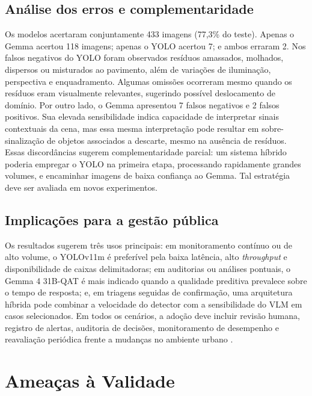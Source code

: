 \documentclass[kdmile,a4paper]{kdmile}
\begin{document}
\subsection{Análise dos erros e complementaridade}
\label{sec:analise-erros}

Os modelos acertaram conjuntamente 433 imagens (77,3\% do teste). Apenas o Gemma acertou 118 imagens; apenas o YOLO acertou 7; e ambos erraram 2. Nos falsos negativos do YOLO foram observados resíduos amassados, molhados, dispersos ou misturados ao pavimento, além de variações de iluminação, perspectiva e enquadramento. Algumas omissões ocorreram mesmo quando os resíduos eram visualmente relevantes, sugerindo possível deslocamento de domínio. Por outro lado, o Gemma apresentou 7 falsos negativos e 2 falsos positivos. Sua elevada sensibilidade indica capacidade de interpretar sinais contextuais da cena, mas essa mesma interpretação pode resultar em sobre-sinalização de objetos associados a descarte, mesmo na ausência de resíduos. Essas discordâncias sugerem complementaridade parcial: um sistema híbrido poderia empregar o YOLO na primeira etapa, processando rapidamente grandes volumes, e encaminhar imagens de baixa confiança ao Gemma. Tal estratégia deve ser avaliada em novos experimentos.

\subsection{Implicações para a gestão pública}
\label{sec:implicacoes-gestao}

Os resultados sugerem três usos principais: em monitoramento contínuo ou de alto volume, o YOLOv11m é preferível pela baixa latência, alto \emph{throughput} e disponibilidade de caixas delimitadoras; em auditorias ou análises pontuais, o Gemma 4 31B-QAT é mais indicado quando a qualidade preditiva prevalece sobre o tempo de resposta; e, em triagens seguidas de confirmação, uma arquitetura híbrida pode combinar a velocidade do detector com a sensibilidade do VLM em casos selecionados. Em todos os cenários, a adoção deve incluir revisão humana, registro de alertas, auditoria de decisões, monitoramento de desempenho e reavaliação periódica frente a mudanças no ambiente urbano \cite{Zuiderwijk2021,Misic2025}.

\section{Ameaças à Validade}
\label{sec:ameacas-validade}
\end{document}
